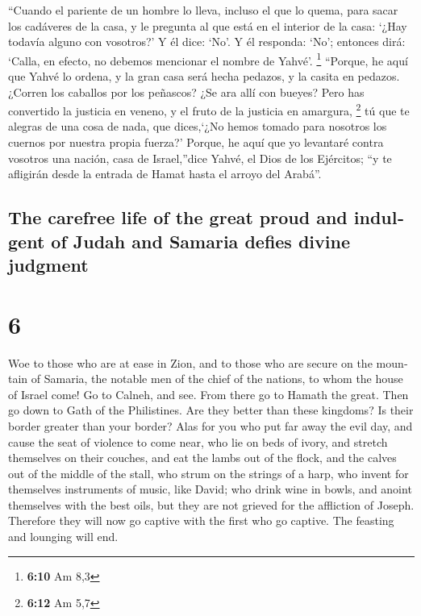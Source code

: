 \begin{paracol}{2}
 ``Cuando el pariente de un hombre lo lleva, incluso el
que lo quema, para sacar los cadáveres de la casa, y le pregunta al que
está en el interior de la casa: `¿Hay todavía alguno con vosotros?' Y él
dice: `No'. Y él responda: `No'; entonces dirá: `Calla, en efecto, no
debemos mencionar el nombre de Yahvé'. \footnote{\textbf{6:10} Am 8,3}
 ``Porque, he aquí que Yahvé lo ordena, y la gran casa
será hecha pedazos, y la casita en pedazos.  ¿Corren los
caballos por los peñascos? ¿Se ara allí con bueyes? Pero has convertido
la justicia en veneno, y el fruto de la justicia en amargura,
\footnote{\textbf{6:12} Am 5,7}  tú que te alegras de una
cosa de nada, que dices,`¿No hemos tomado para nosotros los cuernos por
nuestra propia fuerza?'  Porque, he aquí que yo levantaré
contra vosotros una nación, casa de Israel,''dice Yahvé, el Dios de los
Ejércitos; ``y te afligirán desde la entrada de Hamat hasta el arroyo
del Arabá''.

\switchcolumn
\begin{otherlanguage}{english}

\hypertarget{the-carefree-life-of-the-great-proud-and-indulgent-of-judah-and-samaria-defies-divine-judgment}{%
\subsection{The carefree life of the great proud and indulgent of Judah
and Samaria defies divine
judgment}\label{the-carefree-life-of-the-great-proud-and-indulgent-of-judah-and-samaria-defies-divine-judgment}}

\hypertarget{section-11}{%
\section{6}\label{section-11}}

 Woe to those who are at ease in Zion, and to those who
are secure on the mountain of Samaria, the notable men of the chief of
the nations, to whom the house of Israel come!  Go to
Calneh, and see. From there go to Hamath the great. Then go down to Gath
of the Philistines. Are they better than these kingdoms? Is their border
greater than your border?  Alas for you who put far away
the evil day, and cause the seat of violence to come near,
 who lie on beds of ivory, and stretch themselves on their
couches, and eat the lambs out of the flock, and the calves out of the
middle of the stall,  who strum on the strings of a harp,
who invent for themselves instruments of music, like David;
 who drink wine in bowls, and anoint themselves with the
best oils, but they are not grieved for the affliction of Joseph.
 Therefore they will now go captive with the first who go
captive. The feasting and lounging will end.


\end{otherlanguage}
\end{paracol}
